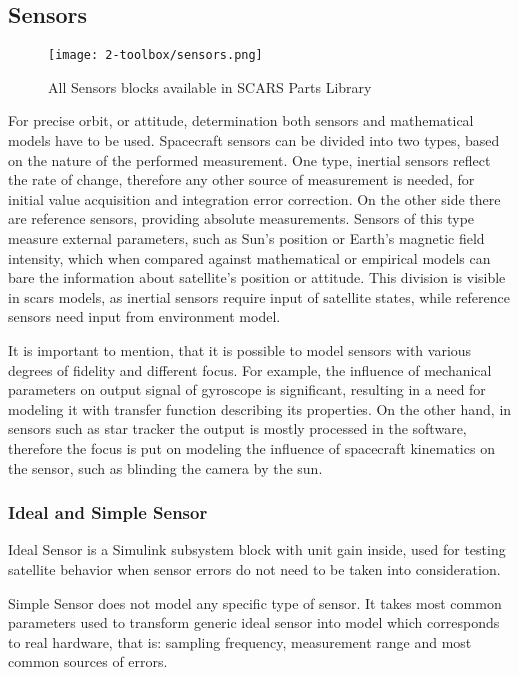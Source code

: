 \clearpage
\subsection{Sensors}\label{sec:sensors}
    \begin{figure}[H]
        \centering
        \texttt{[image: 2-toolbox/sensors.png]}
        \caption{All Sensors blocks available in SCARS Parts Library}
        \label{fig:sensors}
    \end{figure}

    For precise orbit, or attitude, determination both sensors and mathematical models have to be used. Spacecraft sensors can be divided into two types, based on the nature of the performed measurement. One type, inertial sensors reflect the rate of change, therefore any other source of measurement is needed, for initial value acquisition and integration error correction. On the other side there are reference sensors, providing absolute measurements. Sensors of this type measure external parameters, such as Sun's position or Earth's magnetic field intensity, which when compared against mathematical or empirical models can bare the information about satellite's position or attitude. This division is visible in \ac{scars} models, as inertial sensors require input of satellite states, while reference sensors need input from environment model.

    It is important to mention, that it is possible to model sensors with various degrees of fidelity and different focus. For example, the influence of mechanical parameters on output signal of gyroscope is significant, resulting in a need for modeling it with transfer function describing its properties. On the other hand, in sensors such as star tracker the output is mostly processed in the software, therefore the focus is put on modeling the influence of spacecraft kinematics on the sensor, such as blinding the camera by the sun.

    \subsubsection{Ideal and Simple Sensor}
        Ideal Sensor is a Simulink subsystem block with unit gain inside, used for testing satellite behavior when sensor errors do not need to be taken into consideration.

        Simple Sensor does not model any specific type of sensor. It takes most common parameters used to transform generic ideal sensor into model which corresponds to real hardware, that is: sampling frequency, measurement range and most common sources of errors.


